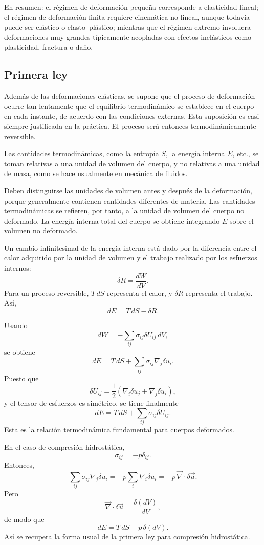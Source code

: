 En resumen: el régimen de deformación pequeña corresponde a elasticidad lineal; el régimen de deformación finita requiere cinemática no lineal, aunque todavía puede ser elástico o elasto--plástico; mientras que el régimen extremo involucra deformaciones muy grandes típicamente acopladas con efectos inelásticos como plasticidad, fractura o daño.

\subsection{Primera ley}

Además de las deformaciones elásticas, se supone que el proceso de deformación ocurre tan lentamente que el equilibrio termodinámico se establece en el cuerpo en cada instante, de acuerdo con las condiciones externas. Esta suposición es casi siempre justificada en la práctica. El proceso será entonces termodinámicamente reversible.

Las cantidades termodinámicas, como la entropía $S$, la energía interna $E$, etc., se toman relativas a una unidad de volumen del cuerpo, y no relativas a una unidad de masa, como se hace usualmente en mecánica de fluidos.

Deben distinguirse las unidades de volumen antes y después de la deformación, porque generalmente contienen cantidades diferentes de materia. Las cantidades termodinámicas se refieren, por tanto, a la unidad de volumen del cuerpo no deformado. La energía interna total del cuerpo se obtiene integrando $E$ sobre el volumen no deformado.

Un cambio infinitesimal de la energía interna está dado por la diferencia entre el calor adquirido por la unidad de volumen y el trabajo realizado por los esfuerzos internos:
$$ \delta R = \frac{dW}{dV}. $$
Para un proceso reversible, $T\,dS$ representa el calor, y $\delta R$ representa el trabajo. Así,
$$ dE = T\,dS - \delta R. $$

Usando
$$ dW = -\sum_{ij}\sigma_{ij}\delta U_{ij}\,dV, $$
se obtiene
$$ dE = T\,dS + \sum_{ij}\sigma_{ij}\nabla_j\delta u_i. $$
Puesto que
$$ \delta U_{ij} = \frac{1}{2}(\nabla_i\delta u_j + \nabla_j\delta u_i), $$
y el tensor de esfuerzos es simétrico, se tiene finalmente
$$ dE = T\,dS + \sum_{ij}\sigma_{ij}\delta U_{ij}. $$
Esta es la relación termodinámica fundamental para cuerpos deformados.

En el caso de compresión hidrostática,
$$ \sigma_{ij} = -p\delta_{ij}. $$
Entonces,
$$ \sum_{ij}\sigma_{ij}\nabla_j\delta u_i = -p\sum_i\nabla_i\delta u_i = -p\,\vec{\nabla}\cdot\delta\vec{u}. $$
Pero
$$ \vec{\nabla}\cdot\delta\vec{u} = \frac{\delta(dV)}{dV}, $$
de modo que
$$ dE = T\,dS - p\,\delta(dV). $$
Así se recupera la forma usual de la primera ley para compresión hidrostática.

